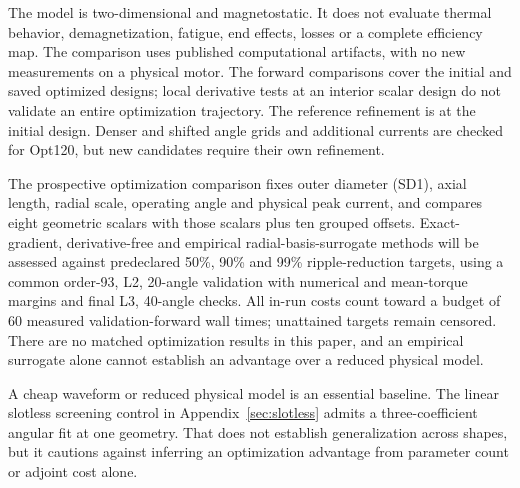 \documentclass{anvil-paper}
\begin{document}
The model is two-dimensional and magnetostatic. It does not evaluate
thermal behavior, demagnetization, fatigue, end effects, losses or a
complete efficiency map. The comparison uses published computational
artifacts, with no new measurements on a physical motor. The forward comparisons cover the initial and saved optimized designs;
local derivative tests at an interior scalar design do not validate an
entire optimization trajectory. The reference refinement is at the initial
design. Denser and shifted angle grids and additional currents are checked
for Opt120, but new candidates require their own refinement.

The prospective optimization comparison fixes outer diameter (SD1), axial length,
radial scale, operating angle and physical peak current, and compares eight
geometric scalars with those scalars plus ten grouped offsets. Exact-gradient,
derivative-free and empirical radial-basis-surrogate methods will be assessed
against predeclared 50\%, 90\% and 99\% ripple-reduction targets, using a
common order-93, L2, 20-angle validation with numerical and mean-torque
margins and final L3, 40-angle checks. All in-run costs count toward a budget of
60 measured validation-forward wall times; unattained targets remain
censored. There are no matched optimization results in this paper, and
an empirical surrogate alone cannot establish an advantage over a reduced
physical model.

A cheap waveform or reduced physical model is an essential baseline.
The linear slotless screening control in Appendix~\ref{sec:slotless}
admits a three-coefficient angular fit at one geometry. That does not
establish generalization across shapes, but it cautions against inferring
an optimization advantage from parameter count or adjoint cost alone.
\end{document}
